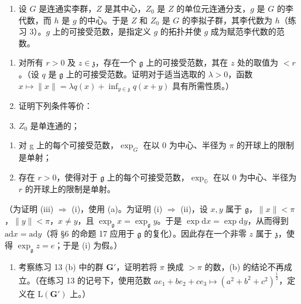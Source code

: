 
\begin{enumerate}
\def\labelenumi{\arabic{enumi}.}
\setcounter{enumi}{17}
\tightlist
\item
  设 \(G\) 是连通实李群，\(Z\) 是其中心，\(Z_0\) 是 \(Z\) 的单位元连通分支，\(g\) 是 \(G\) 的李代数，而 \(h\) 是 \(g\) 的中心。于是 \(Z\) 和 \(Z_0\) 是 \(G\) 的李拟子群，其李代数为 \(h\)（练习 3）。\(g\) 上的可接受范数，是指定义 \(g\) 的拓扑并使 \(g\) 成为赋范李代数的范数。
\end{enumerate}

\begin{enumerate}
\def\labelenumi{(\alph{enumi})}
\item
  对所有 \(r > 0\) 及 \(z \in \mathfrak{z}\)，存在一个 \(\mathfrak{g}\) 上的可接受范数，其在 \(z\) 处的取值为 \(< r\)。（设 \(q\) 是 \(\mathfrak{g}\) 上的可接受范数。证明对于适当选取的 \(\lambda > 0\)，函数 \(x \mapsto \|x\| = \lambda q(x) + \inf_{y \in \mathfrak{z}} q(x + y)\) 具有所需性质。）
\item
  证明下列条件等价：
\item
  \(Z_{0}\) 是单连通的；
\end{enumerate}

\begin{enumerate}
\def\labelenumi{(\roman{enumi})}
\setcounter{enumi}{1}
\item
  对 g 上的每个可接受范数，\(\exp_{G}\) 在以 0 为中心、半径为 \(\pi\) 的开球上的限制是单射；
\item
  存在 \(r > 0\)，使得对于 \(\mathfrak{g}\) 上的每个可接受范数，\(\exp_{\mathbb{G}}\) 在以 0 为中心、半径为 \(r\) 的开球上的限制是单射。
\end{enumerate}

（为证明 (iii) \(\Rightarrow\) (i)，使用 (a)。为证明 (i) \(\Rightarrow\) (ii)，设 \(x, y\) 属于 \(\mathfrak{g}\)，\(\| x \| < \pi\)，\(\| y \| < \pi\)，\(x \neq y\)，且 \(\exp_{\mathfrak{g}} x = \exp_{\mathfrak{g}} y\)。于是 \(\exp \mathrm{d} x = \exp \mathrm{d} y\)，从而得到 \(\mathrm{ad} x = \mathrm{ad} y\)（将 §6 的命题 17 应用于 \(\mathfrak{g}\) 的复化）。因此存在一个非零 \(z\) 属于 \(\mathfrak{z}\)，使得 \(\exp_{\mathfrak{g}} z = e\)；于是 (i) 为假。）

\begin{enumerate}
\def\labelenumi{(\alph{enumi})}
\setcounter{enumi}{2}
\tightlist
\item
  考察练习 13 (b) 中的群 \(\mathbf{G}'\)，证明若将 \(\pi\) 换成 \(> \pi\) 的数，(b) 的结论不再成立。（在练习 13 的记号下，使用范数 \(ae_{1} + be_{2} + ce_{3} \mapsto (a^{2} + b^{2} + c^{2})^{\frac{1}{2}}\)，定义在 \(\mathrm{L}(\mathbf{G}')\) 上。）
\end{enumerate}

